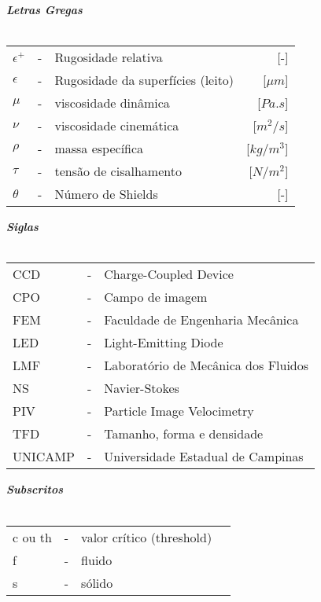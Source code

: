 \clearpage
\noindent
\textbf{\emph{Letras Gregas}}\\\\
\noindent
\begin{tabular}{l c p{.6\linewidth} r}

	$\epsilon^+$ & - & Rugosidade relativa & [-] \\
	$\epsilon$ & - & Rugosidade da superfícies (leito) & [$\mu m $] \\
	$\mu$ & - & viscosidade dinâmica & [$Pa.s$]\\
	$\nu$ & - & viscosidade cinemática & [$m^2/s$]\\
	$\rho$ & - & massa específica & [$kg/m^3$]\\
	$\tau$ & - & tensão de cisalhamento & [$N/m^2$] \\
	$\theta$ & - & Número de Shields & [-] \\

\end{tabular}
\newline \newline
\textbf{\emph{Siglas}}\\\\
\noindent
\begin{tabular}{l c p{.8\linewidth} }

	CCD & - & Charge-Coupled Device\\
	CPO & - & Campo de imagem\\
	FEM & - & Faculdade de Engenharia Mecânica \\
	LED & - & Light-Emitting Diode\\
	LMF & - & Laboratório de Mecânica dos Fluidos\\
	NS & - & Navier-Stokes\\
	PIV & - & Particle Image Velocimetry\\
	TFD & - & Tamanho, forma e densidade \\
	UNICAMP & - & Universidade Estadual de Campinas\\
	
\end{tabular}
\newline \newline
\textbf{\emph{Subscritos}}\\\\
\noindent
\begin{tabular}{l c p{.6\linewidth} r}

	c ou th & - & valor crítico (threshold)& \\
	f & - & fluido & \\
	s & - & sólido & \\
	
\end{tabular}
